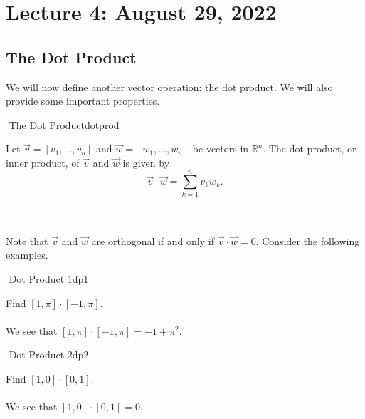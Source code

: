 \pagebreak
        
\section{Lecture 4: August 29, 2022}

    \subsection{The Dot Product}
    
    We will now define another vector operation: the dot product. We will also provide some important properties.
        \begin{definition}{\Stop\,\,The Dot Product}{dotprod}
    
            Let \(\vec{v}=[v_1,\ldots,v_n]\) and \(\vec{w}=[w_1,\ldots,w_n]\) be vectors in \(\mathbb{R}^n\). The dot product, or inner product, of \(\vec{v}\) and \(\vec{w}\) is given by
            \begin{equation*}
                \vec{v}\cdot\vec{w}=\sum_{k=1}^nv_kw_k.
            \end{equation*}
        
        \end{definition}
        \vphantom
        \\
        \\
        Note that \(\vec{v}\) and \(\vec{w}\) are orthogonal if and only if \(\vec{v}\cdot\vec{w}=0\). Consider the following examples.
        \begin{example}{\Difficulty\,\,Dot Product 1}{dp1}
        
            Find \([1,\pi]\cdot[-1,\pi]\).
            \\
            \\
            We see that \([1,\pi]\cdot[-1,\pi]=-1+\pi^2\).
        
        \end{example}
         \begin{example}{\Difficulty\,\,Dot Product 2}{dp2}
        
            Find \([1,0]\cdot[0,1]\).
            \\
            \\
            We see that \([1,0]\cdot[0,1]=0\).
        
        \end{example}
